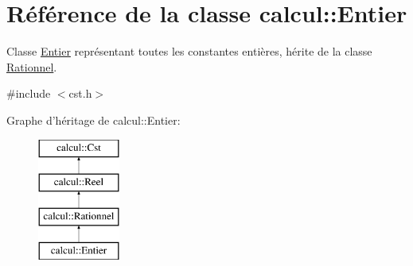 \hypertarget{classcalcul_1_1_entier}{\section{Référence de la classe calcul\-:\-:Entier}
\label{classcalcul_1_1_entier}
}


Classe \hyperlink{classcalcul_1_1_entier}{Entier} représentant toutes les constantes entières, hérite de la classe \hyperlink{classcalcul_1_1_rationnel}{Rationnel}.  




{\ttfamily \#include $<$cst.\-h$>$}

Graphe d'héritage de calcul\-:\-:Entier\-:\begin{figure}[H]
\begin{center}
\leavevmode
\includegraphics[height=4.000000cm]{classcalcul_1_1_entier}
\end{center}
\end{figure}
